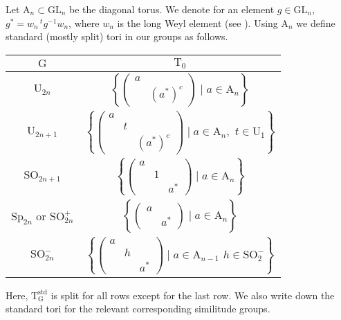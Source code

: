 \documentclass[12pt, reqno]{amsart}
\theoremstyle{definition}
\theoremstyle{definition}
\theoremstyle{definition}
\newcommand{\transpose}[1]{\, {}^{t}#1}
\newcommand{\involution}[1]{#1^{c}}
\newcommand{\GL}{\mathrm{GL}}
\newcommand{\SO}{\mathrm{SO}}
\newcommand{\Sp}{\mathrm{Sp}}
\newcommand{\UnitaryGroup}{\mathrm{U}}
\newcommand{\algebraicGroup}[1]{\boldsymbol{\mathrm{#1}}}
\begin{document}
Let $\algebraicGroup{A}_n \subset \algebraicGroup{\GL}_n$ be the diagonal torus. We denote for an element $g \in \algebraicGroup{\GL}_n$, $g^{\ast} = w_n \transpose{g}^{-1} w_n$, where $w_n$ is the long Weyl element (see ). Using $\algebraicGroup{A}_n$ we define standard (mostly split) tori in our groups as follows.
\begin{center}
\begin{tabular}{|c|c|}
	\hline 
		$\algebraicGroup{G}$ & $\algebraicGroup{T}_0$ \tabularnewline
		\hline 
		\hline 
		$\algebraicGroup{\UnitaryGroup}_{2n}$ & $\left\{ \begin{pmatrix}
			a\\
			& \involution{\left(a^{\ast}\right)}
		\end{pmatrix}  \mid a \in \algebraicGroup{A}_n \right\}$ \tabularnewline
		\hline 
		$\algebraicGroup{\UnitaryGroup}_{2n+1}$ & $\left\{ \begin{pmatrix}
	a \\
	& t\\
	& & \involution{\left(a^{\ast}\right)}
\end{pmatrix}  \mid a \in \algebraicGroup{A}_n,\,\, t \in \algebraicGroup{U}_1 \right\}$ \tabularnewline
\hline 
	$\algebraicGroup{\SO}_{2n+1}$ & $\left\{ \begin{pmatrix}
		a\\
		& 1\\
		& & a^{\ast}
	\end{pmatrix} \mid a \in \algebraicGroup{A}_n \right\}$ \tabularnewline
	\hline 
	$\algebraicGroup{\Sp}_{2n}$ or $\algebraicGroup{\SO}^{+}_{2n}$ & $\left\{ \begin{pmatrix}
		a\\
		& a^{\ast}
	\end{pmatrix} \mid a \in \algebraicGroup{A}_n \right\}$ \tabularnewline
	\hline 
	$\algebraicGroup{\SO}_{2n}^{-}$ & $\left\{ \begin{pmatrix}
		a\\
		& h\\
		& & a^{\ast}
	\end{pmatrix} \mid a \in \algebraicGroup{A}_{n-1}\,\, h \in \algebraicGroup{\SO}_2^{-} \right\}$ \tabularnewline
	\hline		
	\end{tabular}
\end{center}
Here, $\algebraicGroup{T}^{\mathrm{std}}_{\algebraicGroup{G}}$ is split for all rows except for the last row. We also write down the standard tori for the relevant corresponding similitude groups.
\end{document}
